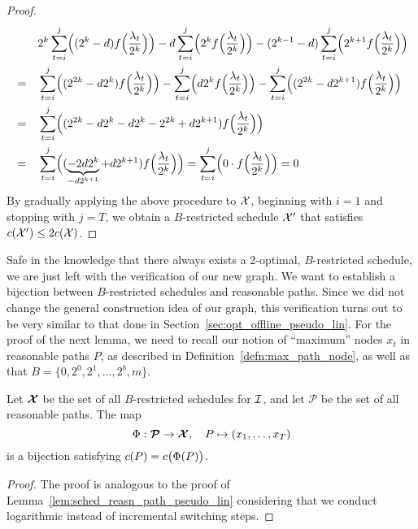 \begin{proof}
\begin{align*}
	&&&2^k\sum\limits_{t=i}^j\Bigl((2^k-d)f\Bigl(\frac{\lambda_t}{2^k}\Bigr)\Bigr)-d\sum\limits_{t=i}^j\Bigl(2^kf\Bigl(\frac{\lambda_t}{2^k}\Bigr)\Bigr)-(2^{k-1}-d)\sum\limits_{t=i}^j\Bigl(2^{k+1}f\Bigl(\frac{\lambda_t}{2^k}\Bigr)\Bigr)\\
	&=&&\sum\limits_{t=i}^j\Bigl((2^{2k}-d2^k)f\Bigl(\frac{\lambda_t}{2^k}\Bigr)\Bigr)-\sum\limits_{t=i}^j\Bigl(d2^kf\Bigl(\frac{\lambda_t}{2^k}\Bigr)\Bigr)-\sum\limits_{t=i}^j\Bigl((2^{2k}-d2^{k+1})f\Bigl(\frac{\lambda_t}{2^k}\Bigr)\Bigr)\\
	&=&&\sum\limits_{t=i}^j\Bigl((2^{2k}-d2^k-d2^k-2^{2k}+d2^{k+1})f\Bigl(\frac{\lambda_t}{2^k}\Bigr)\Bigr)\\
	&=&&\sum\limits_{t=i}^j\Bigl((\underbrace{-2d2^k}_{-d2^{k+1}}+d2^{k+1})f\Bigl(\frac{\lambda_t}{2^k}\Bigr)\Bigr)=\sum\limits_{t=i}^j\Bigl(0\cdot f\Bigl(\frac{\lambda_t}{2^k}\Bigr)\Bigr)=0
\end{align*}	
By gradually applying the above procedure to $\mathcal{X}$, beginning with $i=1$ and stopping with $j=T$, we obtain a $B$-restricted schedule $\mathcal{X}'$ that satisfies $c(\mathcal{X}')\le2c(\mathcal{X})$.
\end{proof}
Safe in the knowledge that there always exists a 2-optimal, $B$-restricted schedule, we are just left with the verification of our new graph. We want to establish a bijection between $B$-restricted schedules and reasonable paths. Since we did not change the general construction idea of our graph, this verification turns out to be very similar to that done in Section~\ref{sec:opt_offline_pseudo_lin}. For the proof of the next lemma, we need to recall our notion of ``maximum'' nodes $x_t$ in reasonable paths $P$, as described in Definition~\ref{defn:max_path_node}, as well as that $B=\{0,2^0,2^1,\dotsc,2^b,m\}$.
\begin{lem}\label{lem:sched_reasn_path_approx_2}
Let $\bm{\mathcal{X}}$ be the set of all $B$-restricted schedules for $\mathcal{I}$, and let $\bm{\mathcal{P}}$ be the set of all reasonable paths. The map
\begin{equation*}
	\Phi:\bm{\mathcal{P}}\rightarrow\bm{\mathcal{X}},\quad P\mapsto (x_1,\dotsc,x_T)
\end{equation*}
is a bijection satisfying $c(P)=c\bigl(\Phi(P)\bigr)$.
\end{lem}
\begin{proof}
The proof is analogous to the proof of Lemma~\ref{lem:sched_reasn_path_pseudo_lin} considering that we conduct logarithmic instead of incremental switching steps.
\end{proof}
